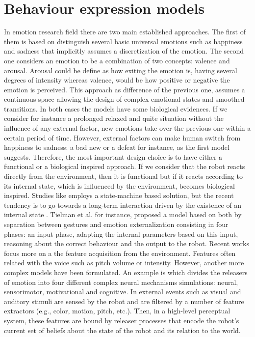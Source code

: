 \section{Behaviour expression models} \label{models}
In emotion research field there are two main established approaches. The first of them is based on distinguish several basic universal emotions such as happiness and sadness that implicitly assumes a discretization of the emotion. The second one considers an emotion to be a combination of two concepts: valence and arousal.
Arousal could be define as how exiting the emotion is, having several degrees of intensity whereas valence, would be how positive or negative the emotion is perceived. This approach as difference of the previous one, assumes a continuous space allowing the design of complex emotional states and smoothed transitions.
In both cases the models have some biological evidences. If we consider for instance a prolonged relaxed and quite situation without the influence of any external factor, new emotions take over the previous one within a certain period of time. However, external factors can make human switch from happiness to sadness: a bad new or a defeat for instance, as the first model suggests.
Therefore, the most important design choice is to have either a functional or a biological inspired approach. If we consider that the robot reacts directly from the environment, then it is functional but if it reacts according to its internal state, which is influenced by the environment, becomes biological inspired. Studies like \cite{schulte1999spontaneous} employs a state-machine based solution, but the recent tendency is to go towards a long-term interaction driven by the existence of an internal state \cite{hirth2011towards} \cite{canamero2001show}.
Tielman et al. for instance, proposed a model \cite{tielman2014adaptive} based on both by separation between gestures and emotion externalization consisting in four phases: an input phase, adapting the internal parameters based on this input, reasoning about the correct behaviour and the output to the robot. Recent works \cite{lim2014mei} focus more on a the feature acquisition from the environment. Features often related with the voice such as pitch volume or intensity.
However, another more complex models have been formulated. An example is \cite{velasquez1998modeling} which divides the releasers of emotion into four different complex neural mechanisms simulations: neural, sensorimotor, motivational and cognitive. In \cite{breazeal2003emotion} external events such as visual and auditory stimuli are sensed by the robot and are filtered by a number of feature extractors (e.g., color, motion, pitch, etc.). Then, in a high-level perceptual system, these features are bound by releaser processes that encode the robot's current set of beliefs about the state of the robot and its relation to the world.
\\
